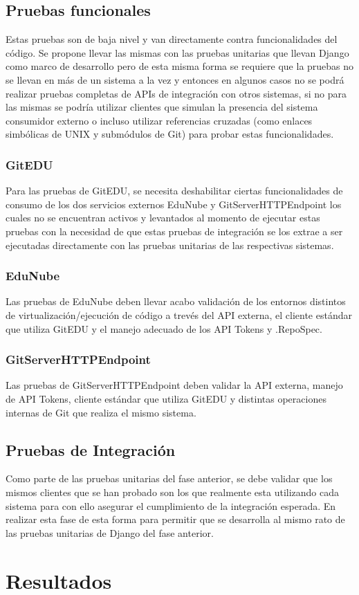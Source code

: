 \subsection{Pruebas funcionales}
Estas pruebas son de baja nivel y van directamente contra funcionalidades del código. Se propone llevar las mismas con las pruebas unitarias que llevan Django como marco de desarrollo pero de esta misma forma se requiere que la pruebas no se llevan en más de un sistema a la vez y entonces en algunos casos no se podrá realizar pruebas completas de APIs de integración con otros sistemas, si no para las mismas se podría utilizar clientes que simulan la presencia del sistema consumidor externo o incluso utilizar referencias cruzadas (como enlaces simbólicas de UNIX y submódulos de Git) para probar estas funcionalidades.

\subsubsection{GitEDU}
Para las pruebas de GitEDU, se necesita deshabilitar ciertas funcionalidades de consumo de los dos servicios externos EduNube y GitServerHTTPEndpoint los cuales no se encuentran activos y levantados al momento de ejecutar estas pruebas con la necesidad de que estas pruebas de integración se los extrae a ser ejecutadas directamente con las pruebas unitarias de las respectivas sistemas.

\subsubsection{EduNube}
Las pruebas de EduNube deben llevar acabo validación de los entornos distintos de virtualización/ejecución de código a trevés del API externa, el cliente estándar que utiliza GitEDU y el manejo adecuado de los API Tokens y .RepoSpec.

\subsubsection{GitServerHTTPEndpoint}
Las pruebas de GitServerHTTPEndpoint deben validar la API externa, manejo de API Tokens, cliente estándar que utiliza GitEDU y distintas operaciones internas de Git que realiza el mismo sistema.

\subsection{Pruebas de Integración}
Como parte de las pruebas unitarias del fase anterior, se debe validar que los mismos clientes que se han probado son los que realmente esta utilizando cada sistema para con ello asegurar el cumplimiento de la integración esperada. En realizar esta fase de esta forma para permitir que se desarrolla al mismo rato de las pruebas unitarias de Django del fase anterior.

\section{Resultados}

